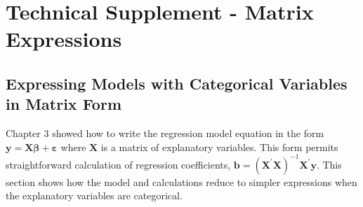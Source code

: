 \section{Technical Supplement - Matrix Expressions}
 \setcounter{equation}{12}
\subsection{Expressing Models with Categorical Variables in
Matrix Form}\label{S4:CatVarMatrix}

Chapter 3 showed how to write the regression model equation in the
form $\mathbf{y=X} \boldsymbol \beta + \boldsymbol \varepsilon$
where $\mathbf{X}$ is a matrix of explanatory variables. This form
permits straightforward calculation of regression coefficients,
$\mathbf{b} = \left(\mathbf{X}^{\prime}
\mathbf{X}\right)^{-1}\mathbf{X}^{\prime} \mathbf{y}$. This section
shows how the model and calculations reduce to simpler expressions
when the explanatory variables are categorical.


